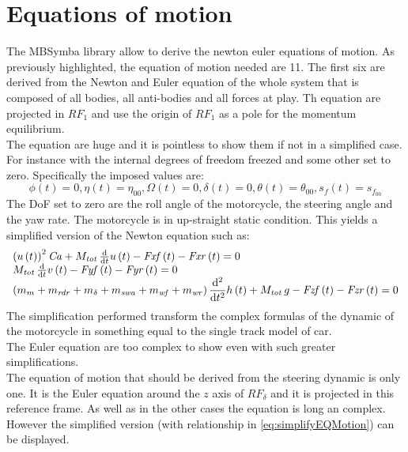 \section{Equations of motion}
%
The MBSymba library\cite{multibod60:online} allow to derive the newton euler equations of motion. As previously highlighted, the equation of motion needed are 11.
The first six are derived from the Newton and Euler equation of the whole system that is composed of all bodies, all anti-bodies and all forces at play. Th equation are projected in $RF_1$ and use the origin of $RF_1$ as a pole for the momentum equilibrium.\\ 
The equation are huge and it is pointless to show them if not in a simplified case. For instance with the internal degrees of freedom freezed and some other set to zero. Specifically the imposed values are:
%
\begin{equation}
    \label{eq:simplifyEQMotion}
    \phi(t) = 0, \eta(t)=\eta_00, \Omega(t) = 0, \delta(t) = 0, \theta(t) = \theta_00, s_f(t)=s_{f_{00}}
\end{equation}
%
The DoF set to zero are the roll angle of the motorcycle, the steering angle and the yaw rate. The motorcycle is in up-straight static condition. 
This yields a simplified version of the Newton equation such as:
%
\begin{equation}
\begin{array}{l}
\left( u \left( t \right)  \right) ^{2}{\it Ca}+M_{{\it tot}}\,{\frac {\rm d}{{\rm d}t}}u \left( t \right) -{\it Fxf} \left( t \right) -{\it Fxr} \left( t \right) = 0 \\
M_{{\it tot}}\,{\frac {\rm d}{{\rm d}t}}v \left( t \right) -{\it Fyf} \left( t \right) -{\it Fyr} \left( t \right) = 0\\
\displaystyle \left( m_{m}+m_{{\it rdr}}+m_{\delta}+m_{{\it swa}}+m_{{\it wf}}+m_{{\it wr}} \right) {\frac {{\rm d}^{2}}{{\rm d}{t}^{2}}}h \left( t \right) +M_{{\it tot}}\,g-{\it Fzf} \left( t \right) -{\it Fzr} \left( t \right) = 0
\end{array}
\end{equation}
%
The simplification performed transform the complex formulas of the dynamic of the motorcycle in something equal to the single track model of car.\\
The Euler equation are too complex to show even with such greater simplifications.\\
The equation of motion that should be derived from the steering dynamic is only one. It is the Euler equation around the $z$ axis of $RF_\delta$ and it is projected in this reference frame. As well as in the other cases the equation is long an complex. However the simplified version (with relationship in \ref{eq:simplifyEQMotion}) can be displayed.

